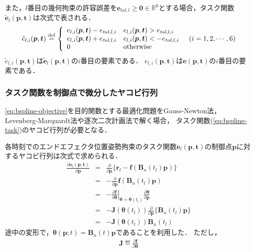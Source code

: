 また，$l$番目の幾何拘束の許容誤差を$\bm{e}_{\mathit{tol},l} \geq \bm{0} \in \mathbb{R}^6$とする場合，タスク関数$\bm{\tilde{e}}_{l}(\bm{p}, \bm{t})$は次式で表される．
\begin{eqnarray}
  \tilde{e}_{l,i}(\mbox{\boldmath{$p$}}, \mbox{\boldmath{$t$}}) \stackrel{\mathrm{def}}{=}
  \left\{ \begin{array}{ll}
    e_{l,i}(\mbox{\boldmath{$p$}}, \mbox{\boldmath{$t$}}) - e_{\mathit{tol},l,i} & e_{l,i}(\mbox{\boldmath{$p$}}, \mbox{\boldmath{$t$}}) > e_{\mathit{tol},l,i} \\
    e_{l,i}(\mbox{\boldmath{$p$}}, \mbox{\boldmath{$t$}}) + e_{\mathit{tol},l,i} & e_{l,i}(\mbox{\boldmath{$p$}}, \mbox{\boldmath{$t$}}) < - e_{\mathit{tol},l,i} \\
    0 & {\rm otherwise} \\
  \end{array} \right. \ \ (i = 1,2,\cdots,6)
\end{eqnarray}
$\tilde{e}_{l,i}(\bm{p}, \bm{t})$は$\bm{\tilde{e}}_{l}(\bm{p}, \bm{t})$の$i$番目の要素である．
$e_{l,i}(\bm{p}, \bm{t})$は$\bm{e}(\bm{p}, \bm{t})$の$i$番目の要素である．

\subsubsection*{タスク関数を制御点で微分したヤコビ行列}

\eqref{eq:bspline-objective}を目的関数とする最適化問題をGauss-Newton法，Levenberg-Marquardt法や逐次二次計画法で解く場合，
タスク関数(\ref{eq:bspline-task})のヤコビ行列が必要となる．

各時刻でのエンドエフェクタ位置姿勢拘束のタスク関数$\bm{e}_l(\bm{p}, \bm{t})$の制御点$\bm{p}$に対するヤコビ行列は次式で求められる．
\begin{eqnarray}
  \frac{\partial \bm{e}_l(\bm{p}, \bm{t})}{\partial \bm{p}} &=& \frac{\partial}{\partial \bm{p}} \{ \bm{r}_l - \bm{f}(\bm{B}_n(t_l)\bm{p}) \} \\
  &=& - \frac{\partial}{\partial \bm{p}} \bm{f}(\bm{B}_n(t_l)\bm{p}) \\
  &=& - \left. \frac{\partial \bm{f}}{\partial \bm{\theta}} \right|_{\bm{\theta} = \bm{\theta}(t_l)} \frac{\partial \bm{\theta}}{\partial \bm{p}} \\
  &=& - \bm{J}(\bm{\theta}(t_l)) \frac{\partial}{\partial \bm{p}} \{ \bm{B}_n(t_l)\bm{p} \} \\
  &=& - \bm{J}(\bm{\theta}(t_l)) \bm{B}_n(t_l) \label{eq:bspline-task-jacobian-with-control}
\end{eqnarray}
途中の変形で，$\bm{\theta}(\bm{p}; t) = \bm{B}_n(t) \bm{p}$であることを利用した．
ただし，
\begin{eqnarray}
  \bm{J} \eqdef \frac{\partial \bm{f}}{\partial \bm{\theta}}
\end{eqnarray}

